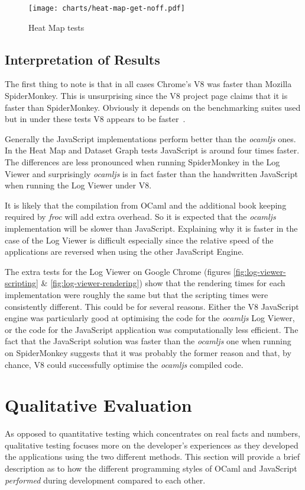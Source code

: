 \begin{figure}
  \texttt{[image: charts/heat-map-get-noff.pdf]}
  \caption{Heat Map tests}
  \label{fig:heat-map-test-noff}
\end{figure}

\subsection{Interpretation of Results}
The first thing to note is that in all cases Chrome's V8 was faster than Mozilla SpiderMonkey. This is unsurprising since the V8 project page claims that it is faster than SpiderMonkey. Obviously it depends on the benchmarking suites used but in under these tests V8 appears to be faster~\cite{bib:v8-proj,bib:are-we-fast}.

Generally the JavaScript implementations perform better than the \emph{ocamljs} ones. In the Heat Map and Dataset Graph tests JavaScript is around four times faster. The differences are less pronounced when running SpiderMonkey in the Log Viewer and surprisingly \emph{ocamljs} is in fact faster than the handwritten JavaScript when running the Log Viewer under V8.

It is likely that the compilation from OCaml and the additional book keeping required by \emph{froc} will add extra overhead. So it is expected that the \emph{ocamljs} implementation will be slower than JavaScript. Explaining why it is faster in the case of the Log Viewer is difficult especially since the relative speed of the applications are reversed when using the other JavaScript Engine.

The extra tests for the Log Viewer on Google Chrome (figures \ref{fig:log-viewer-scripting} \& \ref{fig:log-viewer-rendering}) show that the rendering times for each implementation were roughly the same but that the scripting times were consistently different. This could be for several reasons. Either the V8 JavaScript engine was particularly good at optimising the code for the \emph{ocamljs} Log Viewer, or the code for the JavaScript application was computationally less efficient. The fact that the JavaScript solution was faster than the \emph{ocamljs} one when running on SpiderMonkey suggests that it was probably the former reason and that, by chance, V8 could successfully optimise the \emph{ocamljs} compiled code.

\section{Qualitative Evaluation}
As opposed to quantitative testing which concentrates on real facts and numbers, qualitative testing focuses more on the developer's experiences as they developed the applications using the two different methods. This section will provide a brief description as to how the different programming styles of OCaml and JavaScript \emph{performed} during development compared to each other.

